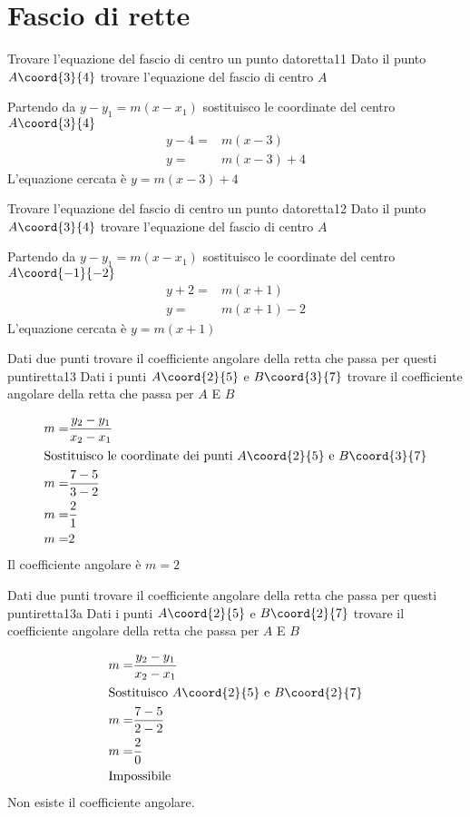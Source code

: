 \section{Fascio di rette}
\begin{esempiot}{Trovare l'equazione del fascio di centro un punto dato}{retta11}
	Dato il punto	$A\coord{3}{4}$ trovare l'equazione del fascio di centro $A$
\end{esempiot}
Partendo da $y-y_1=m(x-x_1)$ sostituisco le coordinate del centro  	$A\coord{3}{4}$
\begin{align*}
	y-4=&m(x-3)\\
	y=&m(x-3)+4
\end{align*}
L'equazione cercata è $y=m(x-3)+4$
\begin{esempiot}{Trovare l'equazione del fascio di centro un punto dato}{retta12}
	Dato il punto	$A\coord{3}{4}$ trovare l'equazione del fascio di centro $A$
\end{esempiot}
Partendo da $y-y_1=m(x-x_1)$ sostituisco le coordinate del centro  	$A\coord{-1}{-2}$
\begin{align*}
	y+2=&m(x+1)\\
	y=&m(x+1)-2
\end{align*}
L'equazione cercata è $y=m(x+1)$
\begin{esempiot}{Dati due punti trovare il coefficiente angolare della retta che passa per questi punti}{retta13}
	Dati i punti $A\coord{2}{5}$ e $B\coord{3}{7}$ trovare il coefficiente angolare della retta che passa per  $A$ E $B$
\end{esempiot}
\begin{align*}
	m=&\dfrac{y_2-y_1}{x_2-x_1}\\
	\intertext{Sostituisco le coordinate dei punti $A\coord{2}{5}$ e $B\coord{3}{7}$}
	m=&\dfrac{7-5}{3-2}\\
	m=&\dfrac{2}{1}\\
	m=&2\\
\end{align*}
Il coefficiente angolare è $m=2$
\begin{cesempiot}{Dati due punti trovare il coefficiente angolare della retta che passa per questi punti}{retta13a}
	Dati i punti $A\coord{2}{5}$ e $B\coord{2}{7}$ trovare il coefficiente angolare della retta che passa per  $A$ E $B$
\end{cesempiot}
\begin{align*}
	m=&\dfrac{y_2-y_1}{x_2-x_1}\\
	\intertext{Sostituisco  $A\coord{2}{5}$ e $B\coord{2}{7}$}
	m=&\dfrac{7-5}{2-2}\\
	m=&\dfrac{2}{0}\\
\intertext{Impossibile}
\end{align*}
Non esiste il coefficiente angolare.
